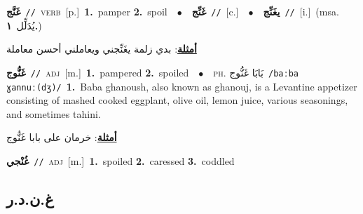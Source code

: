 \documentclass[10pt,a4paper,twoside]{article} %
\begin{document}
\begin{multicols}{2}
{\setlength\topsep{0pt}\textbf{\foreignlanguage{arabic}{غَنَّج}}\ {\color{gray}\texttt{//}\color{black}}\ \textsc{verb}\ [p.]\ \textbf{1.}~pamper  \textbf{2.}~spoil\ \ $\bullet$\ \ \setlength\topsep{0pt}\textbf{\foreignlanguage{arabic}{غَنِّج}}\ {\color{gray}\texttt{//}\color{black}}\ [c.]\ \ $\bullet$\ \ \setlength\topsep{0pt}\textbf{\foreignlanguage{arabic}{يغَنِّج}}\ {\color{gray}\texttt{//}\color{black}}\ [i.]\ \color{gray}(msa. \foreignlanguage{arabic}{يُدَلِّل}~\foreignlanguage{arabic}{\textbf{١.}})\color{black}\  \begin{flushright}\color{gray}\foreignlanguage{arabic}{\textbf{\underline{\foreignlanguage{arabic}{أمثلة}}}: بدي زلمة يغَنِّجني ويعاملني أحسن معاملة}\end{flushright}\color{black}} \vspace{2mm}

{\setlength\topsep{0pt}\textbf{\foreignlanguage{arabic}{غَنُّوج}}\ {\color{gray}\texttt{//}\color{black}}\ \textsc{adj}\ [m.]\ \textbf{1.}~pampered  \textbf{2.}~spoiled\ \ $\bullet$\ \ \textsc{ph.} \color{gray} \foreignlanguage{arabic}{بَابَا غَنُّوج}\color{black}\ {\color{gray}\texttt{/{\sffamily baːba ɣannuː(dʒ)}/}\color{black}}\ \textbf{1.}~Baba ghanoush, also known as  ghanouj, is a Levantine appetizer consisting of mashed cooked eggplant, olive oil, lemon juice, various seasonings, and sometimes tahini.\  \begin{flushright}\color{gray}\foreignlanguage{arabic}{\textbf{\underline{\foreignlanguage{arabic}{أمثلة}}}: خرمان على بابا غَنُّوج}\end{flushright}\color{black}} \vspace{2mm}

{\setlength\topsep{0pt}\textbf{\foreignlanguage{arabic}{غُنْجي}}\ {\color{gray}\texttt{//}\color{black}}\ \textsc{adj}\ [m.]\ \textbf{1.}~spoiled  \textbf{2.}~caressed  \textbf{3.}~coddled\ } \vspace{2mm}

\vspace{-3mm}
\subsection*{\color{blue}\foreignlanguage{arabic}{غ.ن.د.ر}\color{blue}{}} 


\end{multicols}
\end{document}
